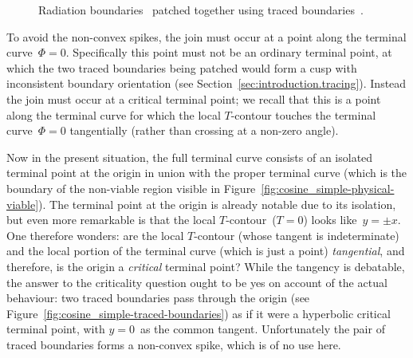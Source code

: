 \begin{figure}
  \newcommand*{\subfigurewidth}{0.36\textwidth}
  \centering
  \hspace*{\fill}
  \begin{subfigure}[t]{\subfigurewidth}
  \end{subfigure}
    \hfill
  \begin{subfigure}[t]{\subfigurewidth}
  \end{subfigure}
  \hspace*{\fill}
  \caption{
    Radiation boundaries~ patched together
    using traced boundaries~.
  }
  \label{fig:cosine_simple-traced-boundaries-patched}
\end{figure}

\begin{figure}
\end{figure}

To avoid the non-convex spikes,
the join must occur at a point along the terminal curve~$\Phi = 0$.
Specifically this point must not be an ordinary terminal point,
at which the two traced boundaries being patched
would form a cusp with inconsistent boundary orientation
(see Section~\ref{sec:introduction.tracing}).
Instead the join must occur at a critical terminal point;
we recall that this is a point along the terminal curve
for which the local $T$-contour touches the terminal curve~$\Phi = 0$
tangentially (rather than crossing at a non-zero angle).

Now in the present situation,
the full terminal curve consists of
an isolated terminal point at the origin
in union with the proper terminal curve
(which is the boundary of the non-viable region
visible in Figure~\ref{fig:cosine_simple-physical-viable}).
The terminal point at the origin is already notable due to its isolation,
but even more remarkable is that the local $T$-contour~($T = 0$)
looks like~$y = \pm x$.
One therefore wonders:
  are the local $T$-contour (whose tangent is indeterminate)
  and the local portion of the terminal curve (which is just a point)
  \emph{tangential}, and therefore,
  is the origin a \emph{critical} terminal point?
While the tangency is debatable,
the answer to the criticality question ought to be yes
on account of the actual behaviour:
two traced boundaries pass through the origin
(see Figure~\ref{fig:cosine_simple-traced-boundaries})
as if it were a hyperbolic critical terminal point,
with $y = 0$~as the common tangent.
Unfortunately the pair of traced boundaries forms a non-convex spike,
which is of no use here.

